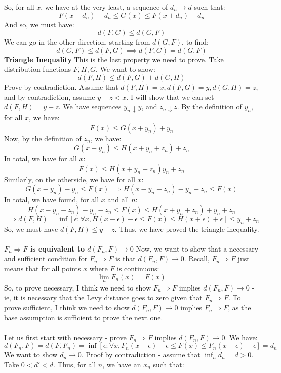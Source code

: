 \documentclass[12pt,a4paper]{article}
\newcommand{\1}[1]{\mathbbm{1}\left\{ #1 \right\}}
\begin{document}
So, for all $x$, we have at the very least, a sequence of $d_n \to d$ such that:
$$
	F(x - d_n) - d_n \leq G(x) \leq F(x + d_n) + d_n
$$
And so, we must have:
$$
	d(F,G) \leq d(G,F)
$$
We can go in the other direction, starting from $d(G,F)$, to find:
$$
	d(G,F) \leq d(F,G) \implies d(F,G) = d(G,F)
$$
\textbf{Triangle Inequality} This is the last property we need to prove. Take distribution functions $F,H,G$. We want to show:
$$
	d(F,H) \leq d(F,G) + d(G,H)
$$
Prove by contradiction. Assume that $d(F,H) = x, d(F,G) = y, d(G,H) = z$, and by contradiction, assume $y + z < x$. I will show that we can set $d(F,H) = y + z$. We have sequences $y_n \downarrow y$, and $z_n \downarrow z$. By the definition of $y_n$, for all $x$, we have:
$$
	F(x) \leq G(x + y_n) + y_n
$$
Now, by the definition of $z_n$, we have:
$$
	G(x + y_n) \leq H(x + y_n + z_n) + z_n
$$
In total, we have for all $x$:
$$
	F(x) \leq H(x + y_n + z_n) y_n + z_n
$$
Similarly, on the otherside, we have for all $x$:
$$
	G(x - y_n) - y_n \leq F(x) \implies H(x - y_n - z_n) - y_n - z_n \leq F(x)
$$
In total, we have found, for all $x$ and all $n$:
$$
	H(x - y_n - z_n) - y_n - z_n \leq F(x) \leq H(x + y_n + z_n) + y_n + z_n
$$
$$
	\implies d(F,H) = 
	\inf\left[\epsilon: \forall x, H(x - \epsilon) - \epsilon \leq F(x) \leq H(x + \epsilon) + \epsilon\right]
	\leq y_n + z_n
$$
So, we must have $d(F,H) \leq y + z$. Thus, we have proved the triangle inequality. 
\\\\
\textbf{$F_n \Rightarrow F$ is equivalent to $d(F_n,F) \to 0$} Now, we want to show that a necessary and sufficient condition for $F_n \Rightarrow F$ is that $d(F_n,F) \to 0$. Recall, $F_n \Rightarrow F$ just means that for all points $x$ where $F$ is continuous:
$$
	\lim_n F_n(x) = F(x)
$$
So, to prove necessary, I think we need to show $F_n \Rightarrow F$ implies $d(F_n,F) \to 0$ - ie, it is necessary that the Levy distance goes to zero given that $F_n \Rightarrow F$. To prove sufficient, I think we need to show $d(F_n,F) \to 0$ implies $F_n \Rightarrow F$, as the base assumption is sufficient to prove the next one.
\\\\
Let us first start with necessary - prove $F_n \Rightarrow F$ implies $d(F_n,F) \to 0$. We have:
$$
	d(F_n,F) = d(F,F_n) =
	\inf\left[\epsilon: \forall x, F_n(x - \epsilon) - \epsilon \leq F(x) \leq F_n(x + \epsilon) + \epsilon\right] = d_n
$$
We want to show $d_n \to 0$. Proof by contradiction - assume that $\inf_n d_n = d > 0$. Take $0 < d' < d$. Thus, for all $n$, we have an $x_n$ such that:
\end{document}
